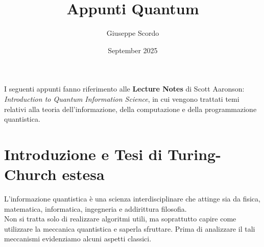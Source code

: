 \documentclass{article}
\title{Appunti Quantum}
\author{Giuseppe Scordo}
\date{September 2025}
\begin{document}
\maketitle
I seguenti appunti fanno riferimento alle \textbf{Lecture Notes} di Scott Aaronson: \textit{Introduction to Quantum Information Science}, in cui vengono trattati temi relativi alla teoria dell'informazione, della computazione e della programmazione quantistica.

\section{Introduzione e Tesi di Turing-Church estesa}
L'informazione quantistica è una scienza interdisciplinare che attinge sia da fisica, matematica, informatica, ingegneria e addirittura filosofia.
\\Non si tratta solo di realizzare algoritmi utili, ma soprattutto capire come utilizzare la meccanica quantistica e saperla sfruttare. Prima di analizzare il tali meccanismi evidenziamo alcuni aspetti classici.
\end{document}

